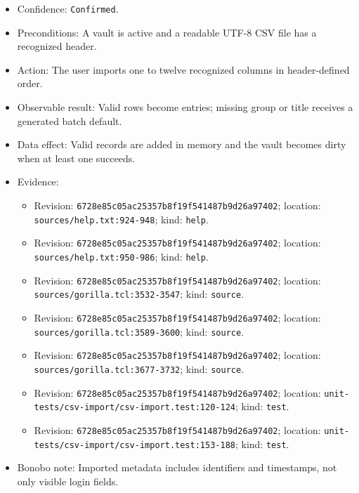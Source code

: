\documentclass[
  letterpaper,
]{article}
\newcommand{\passthrough}[1]{#1}
\providecommand{\tightlist}{%
  \setlength{\itemsep}{0pt}\setlength{\parskip}{0pt}}
\begin{document}
\begin{itemize}
\tightlist
\item
  Confidence: \passthrough{\lstinline!Confirmed!}.
\item
  Preconditions: A vault is active and a readable UTF-8 CSV file has a recognized header.
\item
  Action: The user imports one to twelve recognized columns in header-defined order.
\item
  Observable result: Valid rows become entries; missing group or title receives a generated batch default.
\item
  Data effect: Valid records are added in memory and the vault becomes dirty when at least one succeeds.
\item
  Evidence:

  \begin{itemize}
  \tightlist
  \item
    Revision: \nolinkurl{6728e85c05ac25357b8f19f541487b9d26a97402}; location: \nolinkurl{sources/help.txt:924-948};
    kind: \passthrough{\lstinline!help!}.
  \item
    Revision: \nolinkurl{6728e85c05ac25357b8f19f541487b9d26a97402}; location: \nolinkurl{sources/help.txt:950-986};
    kind: \passthrough{\lstinline!help!}.
  \item
    Revision: \nolinkurl{6728e85c05ac25357b8f19f541487b9d26a97402}; location: \nolinkurl{sources/gorilla.tcl:3532-3547};
    kind: \passthrough{\lstinline!source!}.
  \item
    Revision: \nolinkurl{6728e85c05ac25357b8f19f541487b9d26a97402}; location: \nolinkurl{sources/gorilla.tcl:3589-3600};
    kind: \passthrough{\lstinline!source!}.
  \item
    Revision: \nolinkurl{6728e85c05ac25357b8f19f541487b9d26a97402}; location: \nolinkurl{sources/gorilla.tcl:3677-3732};
    kind: \passthrough{\lstinline!source!}.
  \item
    Revision: \nolinkurl{6728e85c05ac25357b8f19f541487b9d26a97402}; location:
    \nolinkurl{unit-tests/csv-import/csv-import.test:120-124}; kind: \passthrough{\lstinline!test!}.
  \item
    Revision: \nolinkurl{6728e85c05ac25357b8f19f541487b9d26a97402}; location:
    \nolinkurl{unit-tests/csv-import/csv-import.test:153-188}; kind: \passthrough{\lstinline!test!}.
  \end{itemize}
\item
  Bonobo note: Imported metadata includes identifiers and timestamps, not only visible login fields.
\end{itemize}
\end{document}
